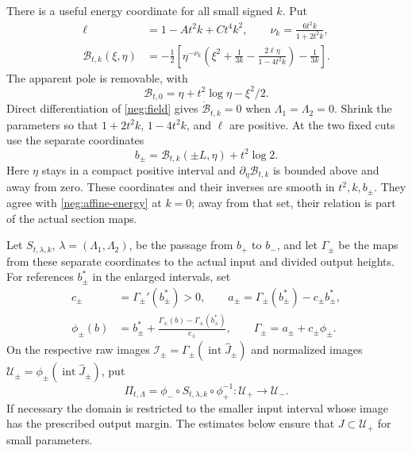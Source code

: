 There is a useful energy coordinate for all small signed \(k\).
Put
\begin{equation}\label{neg:ideal-energy}
\begin{split}
 \ell&=1-At^2k+Ct^4k^2,\qquad
 \nu_k=\frac{6t^2k}{1+2t^2k},\\
 \mathcal B_{t,k}(\xi,\eta)
 &=-\frac12\left[
 \eta^{-\nu_k}\left(\xi^2+\frac1{3k}
             -\frac{2\ell\eta}{1-4t^2k}\right)-\frac1{3k}\right].
\end{split}
\end{equation}
The apparent pole is removable, with
\begin{equation}\label{neg:ideal-energy-zero}
 \mathcal B_{t,0}=\eta+t^2\log\eta-\xi^2/2 .
\end{equation}
Direct differentiation of \eqref{neg:field} gives
\(\dot{\mathcal B}_{t,k}=0\) when
\(\Lambda_1=\Lambda_2=0\). Shrink the parameters so that
\(1+2t^2k\), \(1-4t^2k\), and \(\ell\) are positive.
At the two fixed cuts use the separate coordinates
\begin{equation}\label{neg:cut-labels}
 b_\pm=\mathcal B_{t,k}(\pm L,\eta)+t^2\log2 .
\end{equation}
Here \(\eta\) stays in a compact positive interval and
\(\partial_\eta\mathcal B_{t,k}\) is bounded above and away
from zero. These coordinates and their inverses are smooth in
\(t^2,k,b_\pm\). They agree with \eqref{neg:affine-energy} at
\(k=0\); away from that set, their relation is part of the actual
section maps.

Let \(S_{t,\lambda,k}\), \(\lambda=(\Lambda_1,\Lambda_2)\),
be the passage from \(b_+\) to \(b_-\), and let
\(\Gamma_\pm\) be the maps from these separate coordinates to
the actual input and divided output heights. For references
\(b_\pm^*\) in the enlarged intervals, set
\begin{equation}\label{neg:tail-normalizations}
\begin{split}
 c_\pm&=\Gamma_\pm'(b_\pm^*)>0,
 \qquad a_\pm=\Gamma_\pm(b_\pm^*)-c_\pm b_\pm^*,\\
 \phi_\pm(b)&=b_\pm^*
          +\frac{\Gamma_\pm(b)-\Gamma_\pm(b_\pm^*)}{c_\pm},
 \qquad \Gamma_\pm=a_\pm+c_\pm\phi_\pm .
\end{split}
\end{equation}
On the respective raw images
\(\mathcal I_\pm=\Gamma_\pm(\operatorname{int}\widehat J_\pm)\)
and normalized images
\(\mathcal U_\pm=\phi_\pm(\operatorname{int}\widehat J_\pm)\), put
\begin{equation}\label{neg:exact-composition}
 \Pi_{t,\Lambda}=\phi_-\circ S_{t,\lambda,k}\circ\phi_+^{-1}
       :\mathcal U_+\longrightarrow\mathcal U_- .
\end{equation}
If necessary the domain is restricted to the smaller input interval
whose image has the prescribed output margin. The estimates below
ensure that \(J\subset\mathcal U_+\) for small parameters.

